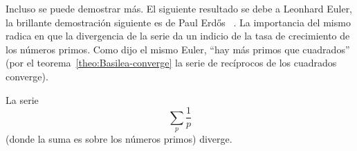   Incluso se puede demostrar más.
  El siguiente resultado se debe a Leonhard Euler,%
  la brillante demostración siguiente es de Paul Erdős~%
    \cite{erdos38:_ueber_reihe_1/p}.%
  La importancia del mismo radica en que la divergencia de la serie
  da un indicio de la tasa de crecimiento de los números primos.
  Como dijo el mismo Euler,
  ``hay más primos que cuadrados''
  (por el teorema~\ref{theo:Basilea-converge} la serie de
   recíprocos de los cuadrados converge).%
  \begin{theorem}
    \label{theo:sum-1/p}
    La serie
    \begin{equation*}
      \sum_p \frac{1}{p}
    \end{equation*}
    (donde la suma es sobre los números primos)
    diverge.
  \end{theorem}
